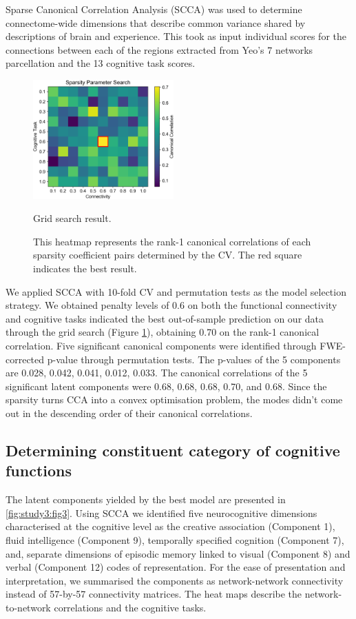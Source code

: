 Sparse Canonical Correlation Analysis (SCCA) was used to determine connectome-wide dimensions that describe common variance shared by descriptions of brain and experience. This took as input individual scores for the connections between each of the regions extracted from Yeo's 7 networks parcellation and the 13 cognitive task scores.

\begin{figure}
    \centering
    \includegraphics[width=0.48\textwidth]{study3/image/study3fig2.png}
    \caption{Grid search result.}
    \caption*{This heatmap represents the rank-1 canonical correlations of each sparsity coefficient pairs determined by the CV. The red square indicates the best result.}
    \label{fig:study3:fig2}
\end{figure}

We applied SCCA with 10-fold CV and permutation tests as the model selection strategy. We obtained penalty levels of 0.6 on both the functional connectivity and cognitive tasks indicated the best out-of-sample prediction on our data through the grid search (Figure \ref{fig:study3:fig2}), obtaining 0.70 on the rank-1 canonical correlation. Five significant canonical components were identified through FWE-corrected p-value through permutation tests. The p-values of the 5 components are 0.028, 0.042, 0.041, 0.012, 0.033. The canonical correlations of the 5 significant latent components were 0.68, 0.68, 0.68, 0.70, and 0.68. Since the sparsity turns CCA into a convex optimisation problem, the modes didn't come out in the descending order of their canonical correlations.

\subsection{Determining constituent category of cognitive functions}

The latent components yielded by the best model are presented in \cref{fig:study3:fig3}. Using SCCA we identified five neurocognitive dimensions characterised at the cognitive level as the creative association (Component 1), fluid intelligence (Component 9), temporally specified cognition (Component 7), and, separate dimensions of episodic memory linked to visual (Component 8) and verbal (Component 12) codes of representation. For the ease of presentation and interpretation, we summarised the components as network-network connectivity instead of 57-by-57 connectivity matrices. The heat maps describe the network-to-network correlations and the cognitive tasks.

